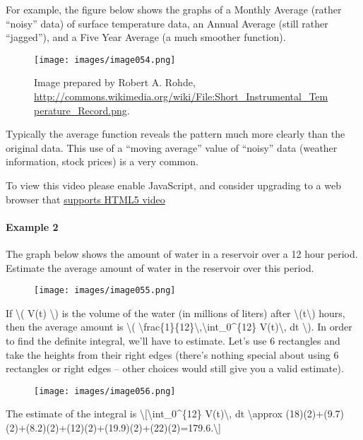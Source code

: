 For example, the figure below shows the graphs of a Monthly Average
(rather ``noisy'' data) of surface temperature data, an Annual Average
(still rather ``jagged''), and a Five Year Average (a much smoother
function).

\begin{figure}
\centering
\texttt{[image: images/image054.png]}
\caption{Image prepared by Robert A. Rohde,
\url{http://commons.wikimedia.org/wiki/File:Short_Instrumental_Temperature_Record.png}.}
\end{figure}

Typically the average function reveals the pattern much more clearly
than the original data. This use of a ``moving average'' value of
``noisy'' data (weather information, stock prices) is a very common.

To view this video please enable JavaScript, and consider upgrading to a
web browser that \href{http://videojs.com/html5-video-support/}{supports
HTML5 video}

\hypertarget{example-2}{%
\paragraph{Example 2}\label{example-2}}

The graph below shows the amount of water in a reservoir over a 12 hour
period. Estimate the average amount of water in the reservoir over this
period.

\begin{figure}
\centering
\texttt{[image: images/image055.png]}
\caption{}
\end{figure}

If \textbackslash{}( V(t) \textbackslash{}) is the volume of the water
(in millions of liters) after \textbackslash{}(t\textbackslash{}) hours,
then the average amount is \textbackslash{}(
\textbackslash{}frac\{1\}\{12\}\textbackslash{},\textbackslash{}int\_0\^{}\{12\}
V(t)\textbackslash{}, dt \textbackslash{}). In order to find the
definite integral, we'll have to estimate. Let's use 6 rectangles and
take the heights from their right edges (there's nothing special about
using 6 rectangles or right edges -- other choices would still give you
a valid estimate).

\begin{figure}
\centering
\texttt{[image: images/image056.png]}
\caption{}
\end{figure}

The estimate of the integral is
\textbackslash{}{[}\textbackslash{}int\_0\^{}\{12\}
V(t)\textbackslash{}, dt \textbackslash{}approx
(18)(2)+(9.7)(2)+(8.2)(2)+(12)(2)+(19.9)(2)+(22)(2)=179.6.\textbackslash{}{]}

